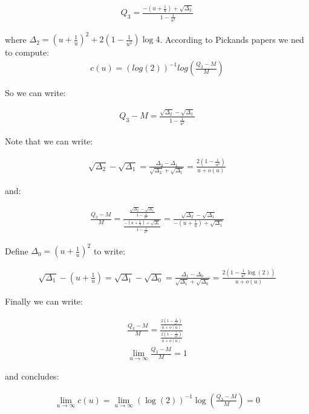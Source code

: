 \documentclass{article}
\begin{document}
\begin{align}
    Q_3 = \frac{-(u+\frac{1}{u}) + \sqrt{\Delta_2}}{1 - \frac{1}{u^2}}
\end{align}

where $\Delta_{2} = \left( u + \frac{1}{u} \right)^{2} + 2 \left( 1 - \frac{1}{u^2} \right) \log{4}$. According to Pickands papers we ned to compute:
\begin{align}
c(u) = (log(2))^{-1} log(\frac{Q_3 - M}{M})
\end{align}

So we can write: 

\begin{align}
Q_3 - M = \frac{ \sqrt{\Delta_2} - \sqrt{\Delta_1} }{1-\frac{1}{u^2}}
\end{align}

Note that we can write:

\begin{align}
\sqrt{\Delta_2} - \sqrt{\Delta_1} = \frac{\Delta_2 - \Delta_1}{\sqrt{\Delta_2} + \sqrt{\Delta_1}} = \frac{2(1-\frac{1}{u^2})}{u+o(u)}
\end{align}

and:

\begin{align}
\frac{Q_3 - M}{M} = \frac{ \frac{ \sqrt{\Delta_2} - \sqrt{\Delta_1} }{1-\frac{1}{u^2}} }{ \frac{ -(u+\frac{1}{u}) + \sqrt{\Delta_1} }{1-\frac{1}{u^2}} } = \frac{ \sqrt{\Delta_2} - \sqrt{\Delta_1} }{ -(u+\frac{1}{u}) + \sqrt{\Delta_1}}
\end{align}
    
Define $\Delta_0 = (u + \frac{1}{u})^2$ to write:

\begin{align}
\sqrt{\Delta_1} - (u+\frac{1}{u}) = \sqrt{\Delta_1} - \sqrt{\Delta_0} = \frac{\Delta_1 - \Delta_0}{\sqrt{\Delta_1} + \sqrt{\Delta_0}} = \frac{2(1-\frac{1}{u^2}\log(2))}{u + o(u)}
\end{align}
    
Finally we can write: 

\begin{align}
\frac{Q_3 - M}{M} = \frac{ \frac{2(1-\frac{1}{u^2})}{u+o(u)} }{ \frac{2(1-\frac{1}{u^2})}{u+o(u)} } \\
\lim_{u\to\infty} \frac{Q_3 - M}{M} = 1
\end{align}

and concludes:

\begin{align}
\lim_{u\to\infty} c(u) = \lim_{u\to\infty} (\log(2))^{-1} \log(\frac{Q_3 - M}{M}) = 0
\end{align}
    
\end{document}
